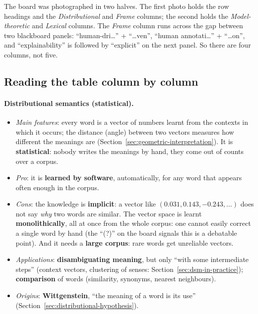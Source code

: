 \begin{nbwarning}
The board was photographed in two halves. The first photo holds the row headings and the
\emph{Distributional} and \emph{Frame} columns; the second holds the
\emph{Model-theoretic} and \emph{Lexical} columns. The \emph{Frame} column runs across
the gap between two blackboard panels: ``human-dri\ldots'' + ``\ldots ven'', ``human
annotati\ldots'' + ``\ldots on'', and ``explainability'' is followed by ``explicit'' on
the next panel. So there are four columns, not five.
\end{nbwarning}

\subsection{Reading the table column by column}
\label{sec:semantics-comparison-columns}

\paragraph{Distributional semantics (statistical).}
\begin{itemize}[nosep]
  \item \emph{Main features}: every word is a vector of numbers learnt from the contexts
        in which it occurs; the distance (angle) between two vectors measures how
        different the meanings are (Section~\ref{sec:geometric-interpretation}). It is
        \textbf{statistical}: nobody writes the meanings by hand, they come out of counts
        over a corpus.
  \item \emph{Pro}: it is \textbf{learned by software}, automatically, for any word that
        appears often enough in the corpus.
  \item \emph{Cons}: the knowledge is \textbf{implicit}: a vector like
        $(0.031, 0.143, -0.243, \ldots)$ does not say \emph{why} two words are similar.
        The vector space is learnt \textbf{monolithically}, all at once from the whole
        corpus: one cannot easily correct a single word by hand (the ``(?)'' on the board
        signals this is a debatable point). And it needs a \textbf{large corpus}: rare
        words get unreliable vectors.
  \item \emph{Applications}: \textbf{disambiguating meaning}, but only ``with some
        intermediate steps'' (context vectors, clustering of senses:
        Section~\ref{sec:dsm-in-practice}); \textbf{comparison} of words (similarity,
        synonyms, nearest neighbours).
  \item \emph{Origins}: \textbf{Wittgenstein}, ``the meaning of a word is its use''
        (Section~\ref{sec:distributional-hypothesis}).
\end{itemize}

